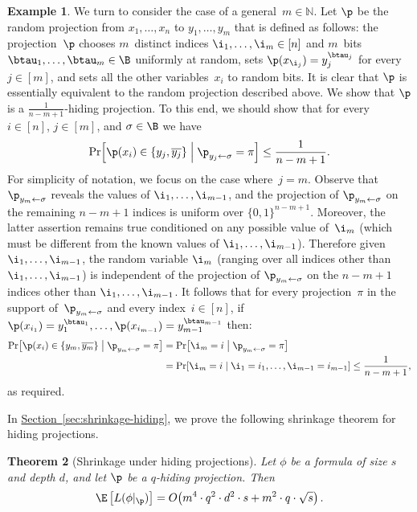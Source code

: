 \documentclass[11pt]{article}
\numberwithin{equation}{section}
\newtheorem{theorem}{Theorem}[section]
\theoremstyle{definition}
\newtheorem{example}[theorem]{Example}
\theoremstyle{plain}
\newcommand{\N}{\mathbb N}
\newcommand{\expref}[2]{\hyperref[#2]{#1~\ref{#2}}}
\theoremstyle{definition}\newtheorem{notation}[theorem]{Notation}\theoremstyle{plain}
\begin{document}
\begin{example}
\label{ex:random-m-variables-alive}We turn to consider the case of a
general~$m\in\N$. Let $\p$ be the random projection from $x_{1},\ldots,x_{n}$
to $y_{1},\ldots,y_{m}$ that is defined as follows: the projection~$\p$
chooses $m$~distinct indices $\i_{1},\ldots,\i_{m}\in\left[n\right]$
and $m$~bits $\btau_{1},\ldots,\btau_{m}\in\B$ uniformly at random,
sets $\p(x_{\i_{j}})=y_{j}^{\btau_{j}}$ for every $j\in\left[m\right]$,
and sets all the other variables~$x_{i}$ to random bits. It is clear
that $\p$ is essentially equivalent to the random projection described
above. We show that $\p$ is a $\frac{1}{n-m+1}$-hiding projection.
To this end, we should show that for every~$i\in\left[n\right]$,
$j\in\left[m\right]$, and $\sigma\in\B$ we have 
\[
\Pr\!\left[\p(x_{i})\in\left\{ y_{j},\overline{y_{j}}\right\} \;\middle|\;\p_{y_{j}\gets\sigma}=\pi\right]\le\frac{1}{n-m+1}.
\]
For simplicity of notation, we focus on the case where~$j=m$. Observe
that $\p_{y_{m}\gets\sigma}$ reveals the values of $\i_{1},\ldots,\i_{m-1}$,
and the projection of $\p_{y_{m}\gets\sigma}$ on the remaining $n-m+1$
indices is uniform over $\{0,1\}^{n-m+1}$. Moreover, the latter assertion
remains true conditioned on any possible value of~$\i_{m}$ (which
must be different from the known values of $\i_{1},\ldots,\i_{m-1}$).
Therefore given $\i_{1},\ldots,\i_{m-1}$, the random variable $\i_{m}$
(ranging over all indices other than $\i_{1},\ldots,\i_{m-1}$) is
independent of the projection of $\p_{y_{m}\gets\sigma}$ on the $n-m+1$
indices other than $\i_{1},\ldots,\i_{m-1}$. It follows that for
every projection~$\pi$ in the support of~$\p_{y_{m}\gets\sigma}$
and every index~$i\in\left[n\right]$, if $\p(x_{i_{1}})=y_{1}^{\btau_{1}},\ldots,\p(x_{i_{m-1}})=y_{m-1}^{\btau_{m-1}}$
then: 
\begin{align*}
\Pr\!\left[\p(x_{i})\in\left\{ y_{m},\overline{y_{m}}\right\} \;\middle|\;\p_{y_{m}\gets\sigma}=\pi\right] & =\Pr\!\left[\i_{m}=i\;\middle|\;\p_{y_{m}\gets\sigma}=\pi\right]\\
 & =\Pr\!\left[\i_{m}=i\;\middle|\;\i_{1}=i_{1},\ldots,\i_{m-1}=i_{m-1}\right]\le\frac{1}{n-m+1},
\end{align*}
as required.
\end{example}

In \expref{Section}{sec:shrinkage-hiding}, we prove the following shrinkage theorem
for hiding projections. 
\begin{theorem}[Shrinkage under hiding projections]
\label{thm:shrinkage-hiding}Let $\phi$ be a formula of size $s$ and
depth $d$, and let $\p$ be a $q$-hiding projection. Then 
\[
\E\left[L(\phi|_{\p})\right]=O\!\left(m^{4}\cdot q^{2}\cdot d^{2}\cdot s+m^{2}\cdot q\cdot\sqrt{s}\right).
\]
\end{theorem}
\end{document}
